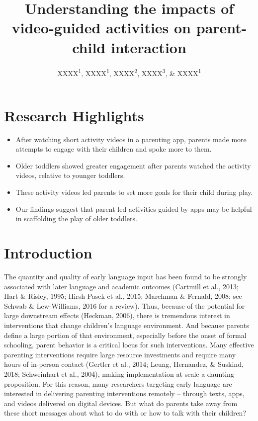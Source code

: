 \documentclass[
  english,
  man]{apa6}
\title{Understanding the impacts of video-guided activities on parent-child interaction}
\author{XXXX\textsuperscript{1}, XXXX\textsuperscript{1}, XXXX\textsuperscript{2}, XXXX\textsuperscript{3}, \& XXXX\textsuperscript{1}}
\date{}
\affiliation{\vspace{0.5cm}\textsuperscript{1} XXXX\\\textsuperscript{2} XXXX\\\textsuperscript{3} XXXX}
\providecommand{\tightlist}{%
  \setlength{\itemsep}{0pt}\setlength{\parskip}{0pt}}
\begin{document}
\maketitle

\hypertarget{research-highlights}{%
\section{Research Highlights}\label{research-highlights}}

\begin{itemize}
\tightlist
\item
  After watching short activity videos in a parenting app, parents made more attempts to engage with their children and spoke more to them.
\item
  Older toddlers showed greater engagement after parents watched the activity videos, relative to younger toddlers.
\item
  These activity videos led parents to set more goals for their child during play.
\item
  Our findings suggest that parent-led activities guided by apps may be helpful in scaffolding the play of older toddlers.
\end{itemize}

\hypertarget{introduction}{%
\section{Introduction}\label{introduction}}

The quantity and quality of early language input has been found to be strongly associated with later language and academic outcomes (Cartmill et al., 2013; Hart \& Risley, 1995; Hirsh-Pasek et al., 2015; Marchman \& Fernald, 2008; see Schwab \& Lew-Williams, 2016 for a review). Thus, because of the potential for large downstream effects (Heckman, 2006), there is tremendous interest in interventions that change children's language environment.
And because parents define a large portion of that environment, especially before the onset of formal schooling, parent behavior is a critical locus for such interventions.
Many effective parenting interventions require large resource investments and require many hours of in-person contact (Gertler et al., 2014; Leung, Hernandez, \& Suskind, 2018; Schweinhart et al., 2004), making implementation at scale a daunting proposition.
For this reason, many researchers targeting early language are interested in delivering parenting interventions remotely -- through texts, apps, and videos delivered on digital devices.
But what do parents take away from these short messages about what to do with or how to talk with their children?
\end{document}
